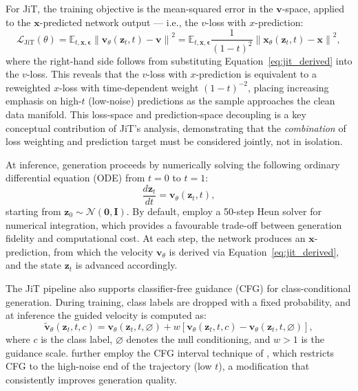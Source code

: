 For JiT, the training objective is the mean-squared error in the $\bm{v}$-space, applied to the $\bm{x}$-predicted network output — i.e., the $v$-loss with $x$-prediction:
\begin{equation}
    \mathcal{L}_{\mathrm{JiT}}(\theta) = \mathbb{E}_{t, \bm{x}, \bm{\epsilon}} \left\| \bm{v}_\theta(\bm{z}_t, t) - \bm{v} \right\|^2 = \mathbb{E}_{t, \bm{x}, \bm{\epsilon}} \frac{1}{(1-t)^2} \left\| \bm{x}_\theta(\bm{z}_t, t) - \bm{x} \right\|^2,
    \label{eq:jit_loss}
\end{equation}
where the right-hand side follows from substituting Equation~\ref{eq:jit_derived} into the $v$-loss. This reveals that the $v$-loss with $x$-prediction is equivalent to a reweighted $x$-loss with time-dependent weight $(1-t)^{-2}$, placing increasing emphasis on high-$t$ (low-noise) predictions as the sample approaches the clean data manifold. This loss-space and prediction-space decoupling is a key conceptual contribution of JiT's analysis, demonstrating that the \emph{combination} of loss weighting and prediction target must be considered jointly, not in isolation.

At inference, generation proceeds by numerically solving the following ordinary differential equation (ODE) from $t = 0$ to $t = 1$:
\begin{equation}
    \frac{d\bm{z}_t}{dt} = \bm{v}_\theta(\bm{z}_t, t),
    \label{eq:jit_ode}
\end{equation}
starting from $\bm{z}_0 \sim \mathcal{N}(\bm{0}, \bm{I})$. By default, \cite{li2025jit} employ a 50-step Heun solver \cite{karras2022edm} for numerical integration, which provides a favourable trade-off between generation fidelity and computational cost. At each step, the network produces an $\bm{x}$-prediction, from which the velocity $\bm{v}_\theta$ is derived via Equation~\ref{eq:jit_derived}, and the state $\bm{z}_t$ is advanced accordingly.

The JiT pipeline also supports classifier-free guidance (CFG) \cite{ho2022classifier} for class-conditional generation. During training, class labels are dropped with a fixed probability, and at inference the guided velocity is computed as:
\begin{equation}
    \tilde{\bm{v}}_\theta(\bm{z}_t, t, c) = \bm{v}_\theta(\bm{z}_t, t, \varnothing) + w \left[\bm{v}_\theta(\bm{z}_t, t, c) - \bm{v}_\theta(\bm{z}_t, t, \varnothing)\right],
    \label{eq:jit_cfg}
\end{equation}
where $c$ is the class label, $\varnothing$ denotes the null conditioning, and $w > 1$ is the guidance scale. \cite{li2025jit} further employ the CFG interval technique of \cite{kynkaanniemi2024applying}, which restricts CFG to the high-noise end of the trajectory (low $t$), a modification that consistently improves generation quality.

